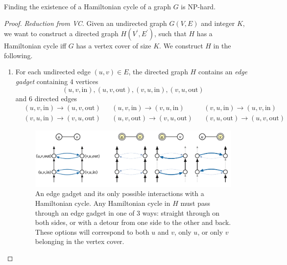     \begin{theorem}
      Finding the existence of a Hamiltonian cycle of a graph $G$ is NP-hard. 
    \end{theorem}
    \begin{proof}
      \textit{Reduction from VC}. Given an undirected graph $G(V, E)$ and integer $K$, we want to construct a directed graph $H(V^\prime, E^\prime)$, such that $H$ has a Hamiltonian cycle iff $G$ has a vertex cover of size $K$. We construct $H$ in the following. 
      \begin{enumerate}
        \item For each undirected edge $(u, v) \in E$, the directed graph $H$ contains an \textit{edge gadget} containing 4 vertices 
          \begin{equation}
            (u, v, \mathrm{in}), (u, v, \mathrm{out}), (v, u, \mathrm{in}), (v, u, \mathrm{out})
          \end{equation}
          and 6 directed edges 
          \begin{align*}
            & (u, v, \mathrm{in}) \rightarrow (u, v, \mathrm{out}) & 
            & (u, v, \mathrm{in}) \rightarrow (v, u, \mathrm{in}) & 
            & (v, u, \mathrm{in}) \rightarrow (u, v, \mathrm{in}) \\
            & (v, u, \mathrm{in}) \rightarrow (v, u, \mathrm{out}) & 
            & (u, v, \mathrm{out}) \rightarrow (v, u, \mathrm{out}) & 
            & (v, u, \mathrm{out}) \rightarrow (u, v, \mathrm{out})
          \end{align*}

          \begin{figure}[H]
            \centering 
            \includegraphics[scale=0.4]{img/edge_gadget.png}
            \caption{An edge gadget and its only possible interactions with a Hamiltonian cycle. Any Hamiltonian cycle in $H$ must pass through an edge gadget in one of 3 ways: straight through on both sides, or with a detour from one side to the other and back. These options will correspond to both $u$ and $v$, only $u$, or only $v$ belonging in the vertex cover.} 
            \label{fig:edge_gadget}
          \end{figure}


\end{enumerate}
\end{proof}
